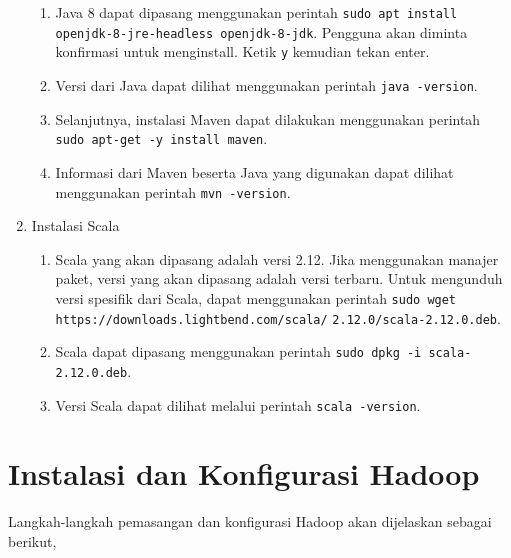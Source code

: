 \begin{enumerate}
\begin{enumerate}
    \item Java 8 dapat dipasang menggunakan perintah \verb|sudo apt install openjdk-8-jre-headless openjdk-8-jdk|. Pengguna akan diminta konfirmasi untuk menginstall. Ketik \verb|y| kemudian tekan enter.
    \item Versi dari Java dapat dilihat menggunakan perintah \verb|java -version|.
    \item Selanjutnya, instalasi Maven dapat dilakukan menggunakan perintah \verb| sudo apt-get -y install maven|.
    \item Informasi dari Maven beserta Java yang digunakan dapat dilihat menggunakan perintah \verb|mvn -version|.
  \end{enumerate}
  \item Instalasi Scala
  \begin{enumerate}
    \item Scala yang akan dipasang adalah versi 2.12. Jika menggunakan manajer paket, versi yang akan dipasang adalah versi terbaru. Untuk mengunduh versi spesifik dari Scala, dapat menggunakan perintah \verb|sudo wget  https://downloads.lightbend.com/scala/| \verb|2.12.0/scala-2.12.0.deb|.
    \item Scala dapat dipasang menggunakan perintah \verb|sudo dpkg -i scala-2.12.0.deb|.
    \item Versi Scala dapat dilihat melalui perintah \verb|scala -version|.
  \end{enumerate}
\end{enumerate}


\chapter{Instalasi dan Konfigurasi Hadoop}
\label{appendix:C}

Langkah-langkah pemasangan dan konfigurasi Hadoop akan dijelaskan sebagai berikut,

